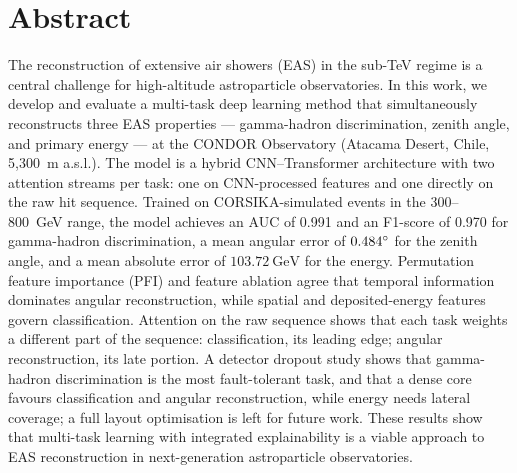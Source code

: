 \chapter*{Abstract}

The reconstruction of extensive air showers (EAS) in the sub-TeV regime is a central challenge for high-altitude astroparticle observatories. In this work, we develop and evaluate a multi-task deep learning method that simultaneously reconstructs three EAS properties --- gamma-hadron discrimination, zenith angle, and primary energy --- at the CONDOR Observatory (Atacama Desert, Chile, 5,300~m a.s.l.). The model is a hybrid CNN--Transformer architecture with two attention streams per task: one on CNN-processed features and one directly on the raw hit sequence.
%
Trained on CORSIKA-simulated events in the 300--800~GeV range, the model achieves an AUC of 0.991 and an F1-score of 0.970 for gamma-hadron discrimination, a mean angular error of $0.484\degree$ for the zenith angle, and a mean absolute error of $103.72~\mathrm{GeV}$ for the energy. Permutation feature importance (PFI) and feature ablation agree that temporal information dominates angular reconstruction, while spatial and deposited-energy features govern classification. Attention on the raw sequence shows that each task weights a different part of the sequence: classification, its leading edge; angular reconstruction, its late portion.
%
A detector dropout study shows that gamma-hadron discrimination is the most fault-tolerant task, and that a dense core favours classification and angular reconstruction, while energy needs lateral coverage; a full layout optimisation is left for future work. These results show that multi-task learning with integrated explainability is a viable approach to EAS reconstruction in next-generation astroparticle observatories.

    \bigskip

